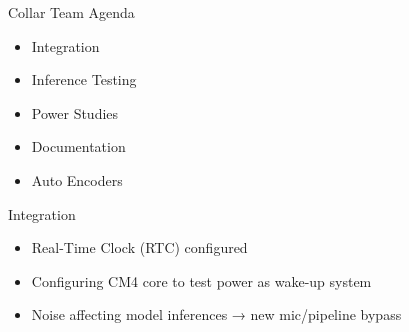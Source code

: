 \begin{frame}{Collar Team Agenda}
    \begin{itemize}
        \item Integration
        \item Inference Testing
        \item Power Studies
        \item Documentation
        \item Auto Encoders       
    \end{itemize}
\end{frame}

\begin{frame}{Integration}
    \begin{itemize}
        \item Real-Time Clock (RTC) configured
        \item Configuring CM4 core to test power as wake-up system
        \item Noise affecting model inferences → new mic/pipeline bypass
    \end{itemize}
\end{frame}


